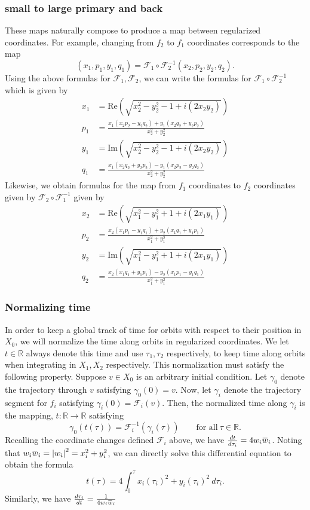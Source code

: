 \documentclass[10pt]{article}
\newcommand{\rr}{\mathbb{R}}
\newcommand{\cF}{\mathcal{F}}
\newcommand{\overbar}[1]{\mkern 1.5mu\overline{\mkern-1.5mu#1\mkern-1.5mu}\mkern 1.5mu}
\newcommand{\abs}[1]{\left| #1 \right|}
\renewcommand{\Re}{\text{Re}}
\renewcommand{\Im}{\text{Im}}
\begin{document}
\subsubsection{small to large primary and back}
These maps naturally compose to produce a map between regularized coordinates. For example, changing from $f_2$ to $f_1$ coordinates corresponds to the map
\[
(x_1 ,p_1 ,y_1 ,q_1) = \mathcal{F}_1 \circ \mathcal{F}^{-1}_2 \left(x_2,p_2,y_2,q_2\right).
\]
Using the above formulas for $\cF_1, \cF_2$, we can write the formulas for $\mathcal{F}_1 \circ \mathcal{F}^{-1}_2$ which is given by
\begin{align*}
x_1 & =  \Re \left(\sqrt{x_2^2 - y_2^2 - 1 + i(2x_2y_2) } \right) \\
p_1 & = \frac{x_1(x_2p_2 - y_2q_2) + y_1(x_2q_2 + y_2p_2)}{x_2^2 + y_2^2} \\
y_1 & = \Im \left(\sqrt{x_2^2 - y_2^2 - 1 + i(2x_2y_2) } \right) \\
q_1 & = \frac{x_1(x_2q_2 + y_2p_2) - y_1(x_2p_2 - y_2q_2)}{x_2^2 + y_2^2}
\end{align*}
Likewise, we obtain formulas for the map from $f_1$ coordinates to $f_2$ coordinates given by $\mathcal{F}_2 \circ \mathcal{F}^{-1}_1$ given by 
\begin{align*}
x_2 & =  \Re \left( \sqrt{x_1^2 - y_1^2 + 1 + i(2x_1y_1) } \right) \\
p_2 & = \frac{x_2(x_1p_1 - y_1q_1) + y_2(x_1q_1 + y_1p_1)}{x_1^2 + y_1^2} \\
y_2 & = \Im \left( \sqrt{x_1^2 - y_1^2 + 1 + i(2x_1y_1) } \right) \\
q_2 & = \frac{x_2(x_1q_1 + y_1p_1) - y_2(x_1p_1 - y_1q_1)}{x_1^2 + y_1^2}
\end{align*}


\subsubsection{Normalizing time}
In order to keep a global track of time for orbits with respect to their position in $X_0$, we will normalize the time along orbits in regularized coordinates. We let $t \in \rr$ always denote this time and use $\tau_1, \tau_2$ respectively, to keep time along orbits when integrating in $X_1,X_2$ respectively. This normalization must satisfy the following property. Suppose $v \in X_0$ is an arbitrary initial condition. Let $\gamma_0$ denote the trajectory through $v$ satisfying $\gamma_0(0) = v$. Now, let $\gamma_i$ denote the trajectory segment for $f_i$ satisfying $\gamma_i(0) = \mathcal{F}_i(v)$. Then, the normalized time along $\gamma_i$ is the mapping, $t : \rr \to \rr$ satisfying
\[
\gamma_0(t(\tau)) = \mathcal{F}_i^{-1} \left( \gamma_i(\tau)\right) \qquad \text{for all} \ \tau \in \rr. 
\]
Recalling the coordinate changes defined $\mathcal{F}_i$ above, we have $\frac{dt}{d \tau_i} = 4w_i \overbar{w}_i$. Noting that $w_i \overbar{w}_i = \abs{w_i}^2 = x_i^2 + y_i^2$, we can directly solve this differential equation to obtain the formula
\[
t(\tau) = 4\int_0^{\tau} x_i(\tau_i)^2 + y_i(\tau_i)^2 \ d \tau_i .
\]
Similarly, we have $\frac{d \tau_i}{dt} = \frac{1}{4 w_i \overbar{w}_i}$
\end{document}
